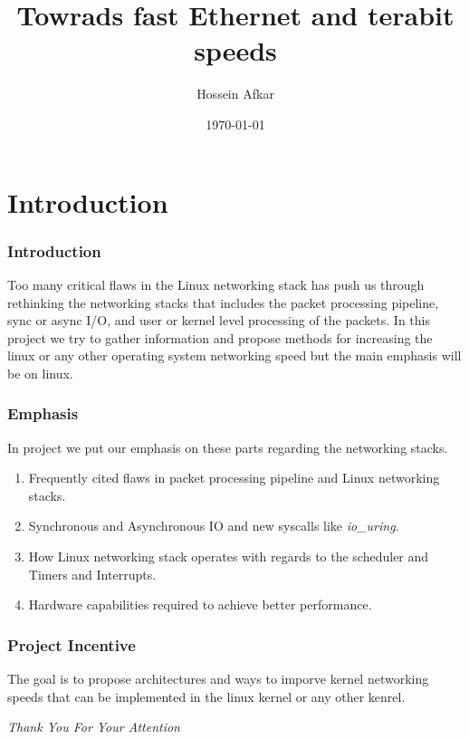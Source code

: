 \documentclass{beamer}
\title[Terabit Networking]
{Towrads fast Ethernet and terabit speeds}
\author[]{Hossein Afkar}
\institute{University of Tehran}
\date{\today}
\begin{document}
\frame{\titlepage}

\section{Introduction}
\begin{frame}
    \frametitle{Introduction}
    Too many critical flaws in the Linux networking stack has push us
    through rethinking the networking stacks that
    includes the packet processing pipeline, sync or async I/O, and user or
    kernel level processing of the packets.
    In this project we try to gather information and propose methods
    for increasing the linux or any other operating system networking speed but
    the main emphasis will be on linux.
\end{frame}

\begin{frame}
    \frametitle{Emphasis}
    In project we put our emphasis on these parts regarding the networking
    stacks.
    \begin{enumerate}
        \item Frequently cited flaws in packet processing pipeline and Linux
            networking stacks.
        \item Synchronous and Asynchronous IO and new syscalls like 
            \textit{io\_uring}.
        \item How Linux networking stack operates with regards to the
            scheduler and Timers and Interrupts.
        \item Hardware capabilities required to achieve better performance.
    \end{enumerate}
\end{frame}

\begin{frame}
    \frametitle{Project Incentive}
    The goal is to propose architectures and ways to imporve kernel networking
    speeds that can be implemented in the linux kernel or any other kenrel.
\end{frame}

\begin{frame}
  \centering \Large
  \emph{Thank You For Your Attention}
\end{frame}
\end{document}
